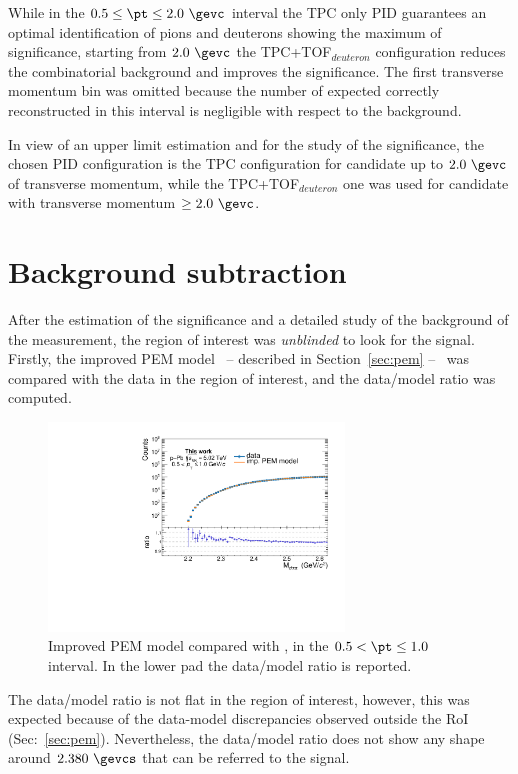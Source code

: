 While in the $0.5 \leq \pt \leq 2.0\ \gevc$ interval the TPC only PID guarantees an optimal 
identification of pions and deuterons showing the maximum of significance, starting from  $2.0\ \gevc$ the
TPC+TOF$_{deuteron}$ configuration reduces the combinatorial background and improves the significance. 
The first transverse momentum bin was omitted because the number of expected \ds correctly
reconstructed in this interval is negligible with respect to the background.

In view of an upper limit estimation and for the study of the significance, the chosen PID configuration 
is the TPC configuration for \ds candidate up to $2.0\ \gevc$ of transverse momentum, while the
TPC+TOF$_{deuteron}$ one was used for \ds candidate with transverse momentum $\geq 2.0\ \gevc$.

%
%
\section{Background subtraction} \label{sec:backsub}

After the estimation of the significance and a detailed study of the background of the measurement,
the region of interest was \textit{unblinded} to look for the \ds signal.
Firstly, the improved PEM model \ -- described in Section~\ref{sec:pem} -- \ was compared
with the data in the region of interest, and the data/model ratio was computed.

\begin{figure} [htb]
    \centering
    \includegraphics[width=0.70\textwidth]{gfx/appendix/backsub/can_unblind1}
    \caption{Improved PEM model compared with \minv, in the $0.5 < \pt \leq 1.0$ \gevc interval. In the lower pad the data/model ratio is reported.}
    \label{fig:unbl05-1}
\end{figure}

The data/model ratio is not flat in the region of interest, however, this was expected because of the 
data-model discrepancies observed outside the RoI (Sec:~\ref{sec:pem}).
Nevertheless, the data/model ratio does not show any shape around $2.380\ \gevcs$ that can be referred 
to the \ds signal.


